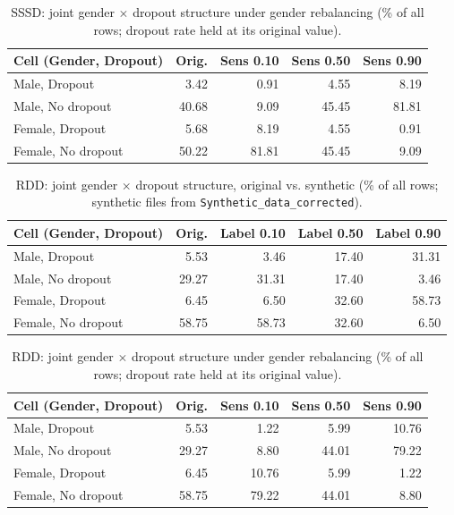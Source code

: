 \begin{table}[ht]
\centering\footnotesize
\caption{SSSD: joint gender $\times$ dropout structure under gender rebalancing
(\% of all rows; dropout rate held at its original value).}
\begin{tabular}{lrrrr}
\toprule
Cell (Gender, Dropout) & Orig. & Sens 0.10 & Sens 0.50 & Sens 0.90 \\
\midrule
Male, Dropout    & 3.42 & 0.91 & 4.55 & 8.19 \\
Male, No dropout & 40.68 & 9.09 & 45.45 & 81.81 \\
Female, Dropout    & 5.68 & 8.19 & 4.55 & 0.91 \\
Female, No dropout & 50.22 & 81.81 & 45.45 & 9.09 \\
\bottomrule
\end{tabular}
\end{table}


\begin{table}[ht]
\centering\footnotesize
\caption{RDD: joint gender $\times$ dropout structure, original vs. synthetic
(\% of all rows; synthetic files from \texttt{Synthetic\_data\_corrected}).}
\begin{tabular}{lrrrr}
\toprule
Cell (Gender, Dropout) & Orig. & Label 0.10 & Label 0.50 & Label 0.90 \\
\midrule
Male, Dropout    & 5.53 & 3.46 & 17.40 & 31.31 \\
Male, No dropout & 29.27 & 31.31 & 17.40 & 3.46 \\
Female, Dropout    & 6.45 & 6.50 & 32.60 & 58.73 \\
Female, No dropout & 58.75 & 58.73 & 32.60 & 6.50 \\
\bottomrule
\end{tabular}
\end{table}

\begin{table}[ht]
\centering\footnotesize
\caption{RDD: joint gender $\times$ dropout structure under gender rebalancing
(\% of all rows; dropout rate held at its original value).}
\begin{tabular}{lrrrr}
\toprule
Cell (Gender, Dropout) & Orig. & Sens 0.10 & Sens 0.50 & Sens 0.90 \\
\midrule
Male, Dropout    & 5.53 & 1.22 & 5.99 & 10.76 \\
Male, No dropout & 29.27 & 8.80 & 44.01 & 79.22 \\
Female, Dropout    & 6.45 & 10.76 & 5.99 & 1.22 \\
Female, No dropout & 58.75 & 79.22 & 44.01 & 8.80 \\
\bottomrule
\end{tabular}
\end{table}
